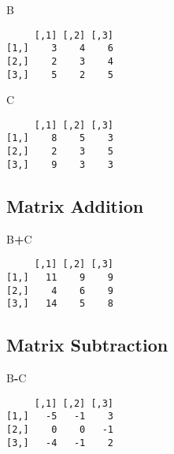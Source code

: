\documentclass[
]{article}
\newenvironment{Shaded}{\begin{snugshade}}{\end{snugshade}}
\newcommand{\NormalTok}[1]{#1}
\newcommand{\SpecialCharTok}[1]{\textcolor[rgb]{0.81,0.36,0.00}{\textbf{#1}}}
\begin{document}
\begin{Shaded}
\begin{Highlighting}[]
\NormalTok{B}
\end{Highlighting}
\end{Shaded}

\begin{verbatim}
     [,1] [,2] [,3]
[1,]    3    4    6
[2,]    2    3    4
[3,]    5    2    5
\end{verbatim}

\begin{Shaded}
\begin{Highlighting}[]
\NormalTok{C}
\end{Highlighting}
\end{Shaded}

\begin{verbatim}
     [,1] [,2] [,3]
[1,]    8    5    3
[2,]    2    3    5
[3,]    9    3    3
\end{verbatim}

\hypertarget{matrix-addition}{%
\subsection{Matrix Addition}\label{matrix-addition}}

\begin{Shaded}
\begin{Highlighting}[]
\NormalTok{B}\SpecialCharTok{+}\NormalTok{C}
\end{Highlighting}
\end{Shaded}

\begin{verbatim}
     [,1] [,2] [,3]
[1,]   11    9    9
[2,]    4    6    9
[3,]   14    5    8
\end{verbatim}

\hypertarget{matrix-subtraction}{%
\subsection{Matrix Subtraction}\label{matrix-subtraction}}

\begin{Shaded}
\begin{Highlighting}[]
\NormalTok{B}\SpecialCharTok{{-}}\NormalTok{C}
\end{Highlighting}
\end{Shaded}

\begin{verbatim}
     [,1] [,2] [,3]
[1,]   -5   -1    3
[2,]    0    0   -1
[3,]   -4   -1    2
\end{verbatim}
\end{document}

